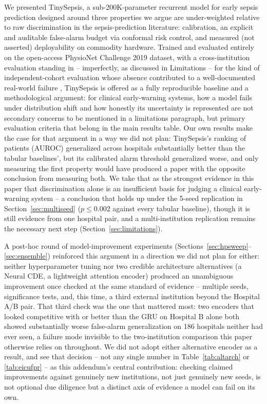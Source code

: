 \documentclass[11pt]{article}
\begin{document}
We presented TinySepsis, a sub-200K-parameter recurrent model for early sepsis prediction designed around three properties we argue are under-weighted relative to raw discrimination in the sepsis-prediction literature: calibration, an explicit and auditable false-alarm budget via conformal risk control, and measured (not asserted) deployability on commodity hardware. Trained and evaluated entirely on the open-access PhysioNet Challenge 2019 dataset, with a cross-institution evaluation standing in -- imperfectly, as discussed in Limitations -- for the kind of independent-cohort evaluation whose absence contributed to a well-documented real-world failure \citep{wong2021external}, TinySepsis is offered as a fully reproducible baseline and a methodological argument: for clinical early-warning systems, how a model fails under distribution shift and how honestly its uncertainty is represented are not secondary concerns to be mentioned in a limitations paragraph, but primary evaluation criteria that belong in the main results table. Our own results make the case for that argument in a way we did not plan: TinySepsis's ranking of patients (AUROC) generalized across hospitals substantially better than the tabular baselines', but its calibrated alarm threshold generalized worse, and only measuring the first property would have produced a paper with the opposite conclusion from measuring both. We take that as the strongest evidence in this paper that discrimination alone is an insufficient basis for judging a clinical early-warning system -- a conclusion that holds up under the 5-seed replication in Section~\ref{sec:multiseed} ($p\le0.002$ against every tabular baseline), though it is still evidence from one hospital pair, and a multi-institution replication remains the necessary next step (Section~\ref{sec:limitations}).

A post-hoc round of model-improvement experiments (Sections~\ref{sec:hpsweep}--\ref{sec:ensemble}) reinforced this argument in a direction we did not plan for either: neither hyperparameter tuning nor two credible architecture alternatives (a Neural CDE, a lightweight attention encoder) produced an unambiguous improvement once checked at the same standard of evidence -- multiple seeds, significance tests, and, this time, a third external institution beyond the Hospital A/B pair. That third check was the one that mattered most: two encoders that looked competitive with or better than the GRU on Hospital B alone both showed substantially worse false-alarm generalization on 186 hospitals neither had ever seen, a failure mode invisible to the two-institution comparison this paper otherwise relies on throughout. We did not adopt either alternative encoder as a result, and see that decision -- not any single number in Table~\ref{tab:altarch} or \ref{tab:eicufpr} -- as this addendum's central contribution: checking claimed improvements against genuinely new institutions, not just genuinely new seeds, is not optional due diligence but a distinct axis of evidence a model can fail on its own.
\end{document}
